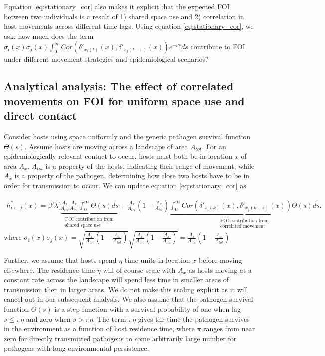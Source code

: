 ﻿\documentclass[11pt]{article}
\begin{document}
Equation \ref{eq:stationary_cor} also makes it explicit that the expected FOI between two individuals is a result of 1) shared space use and 2) correlation in host movements across different time lags. Using equation \ref{eq:stationary_cor}, we ask: how much does the term $\sigma_i(x) \sigma_j(x) \int_{0}^{\infty} Cor(\delta'_{x_i(t)}(x), \delta'_{x_j(t - s)}(x)) e^{-\nu s} ds$ contribute to FOI under different movement strategies and epidemiological scenarios?

\subsection*{Analytical analysis: The effect of correlated movements on FOI for uniform space use and direct contact}

Consider hosts using space uniformly and the generic pathogen survival function $\Theta(s)$.%
Assume hosts are moving across a landscape of area $A_{tot}$.  For an epidemiologically relevant contact to occur, hosts must both be in location $x$ of area $A_x$. $A_{tot}$ is a property of the hosts, indicating their range of movement, while $A_x$ is a property of the pathogen, determining how close two hosts have to be in order for transmission to occur. We can update equation \ref{eq:stationary_cor} as

\begin{equation}
    \begin{aligned}
    h^*_{i \leftarrow j}(x) = \beta' \lambda [ \underbrace{\frac{A_x}{A_{tot}}\frac{A_x}{A_{tot}} \int_{0}^{\infty} \Theta(s) ds}_{\substack{\text{FOI contribution from} \\ \text{shared space use}}} + \frac{A_x}{A_{tot}} (1 - \frac{A_x}{A_{tot}})\underbrace{\int_{0}^{\infty} Cor(\delta'_{x_i(k)}(x), \delta'_{x_j(k - s)}(x)) \Theta(s) ds}_{\substack{\text{FOI contribution from} \\ \text{correlated movement}}}.
    \end{aligned}
    \label{eq:stationary_uniform}
\end{equation}
where  $\sigma_i(x) \sigma_j(x) = \sqrt{\frac{A_x}{A_{tot}}(1 - \frac{A_x}{A_{tot}})}\sqrt{\frac{A_x}{A_{tot}}(1 - \frac{A_x}{A_{tot}})} = \frac{A_x}{A_{tot}}(1 - \frac{A_x}{A_{tot}})$

Further, we assume that hosts spend $\eta$ time units in location $x$ before moving elsewhere.  The residence time $\eta$ will of course scale with $A_x$ as hosts moving at a constant rate across the landscape will spend less time in smaller areas of transmission then in larger areas.  We do not make this scaling explicit as it will cancel out in our subsequent analysis. We also assume that the pathogen survival function $\Theta(s)$ is a step function with a survival probability of one when lag $s \leq \pi \eta$ and zero when $s > \pi \eta$. 
The term $\pi \eta$ gives the time the pathogen survives in the environment as a function of host residence time, where $\pi$ ranges from near zero for directly transmitted pathogens to some arbitrarily large number for pathogens with long environmental persistence.  
\end{document}
